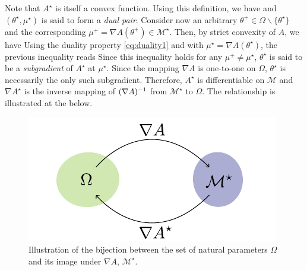Note that $A^{\star}$ is itself a convex function. Using this definition, we have
%
%
and $(\theta^{\star},\mu^{\star})$ is said to form a \emph{dual pair}. Consider now an arbitrary $\theta^{+}\in\Omega\backslash\{\theta^{\star}\}$ and the corresponding $\mu^{+}=\nabla A(\theta^{+})\in\mathcal M^{\star}$. Then, by strict convexity of $A$, we have
%
%
Using the duality property \eqref{eq:duality1} and with $\mu^{\star}=\nabla A(\theta^{\star})$, the previous inequality reads
%
%
Since this inequality holds for any $\mu^{+}\neq \mu^{\star}$, $\theta^{\star}$ is said to be a \emph{subgradient} of $A^{\star}$ at $\mu^{\star}$. Since the mapping $\nabla A$ is one-to-one on $\Omega$, $\theta^{\star}$ is necessarily the only such subgradient. Therefore, $A^{\star}$ is differentiable on $\mathcal M$ \citep[theorem 25.1]{rockafellar70} and $\nabla A^{\star}$ is the inverse mapping of $(\nabla A)^{-1}$ from $\mathcal M^{\star}$ to $\Omega$. The relationship is illustrated at the  below.

\begin{figure}[!h]
	\center
	\includegraphics{figures/expf/mapping}
	\caption{\label{bijOmM}Illustration of the bijection between the set of natural parameters $\Omega$ and its image under $\nabla A$, $\mathcal M^{\star}$.}
\end{figure}
%
